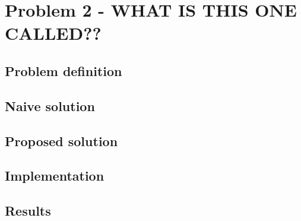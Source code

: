 \section{Problem 2 - WHAT IS THIS ONE CALLED??}


\subsection{Problem definition}
\label{defintion}


\subsection{Naive solution}
\label{naive}


\subsection{Proposed solution}
\label{proposed}

\subsection{Implementation}
\label{our_implementation}

\subsection{Results}
\label{our_results}
